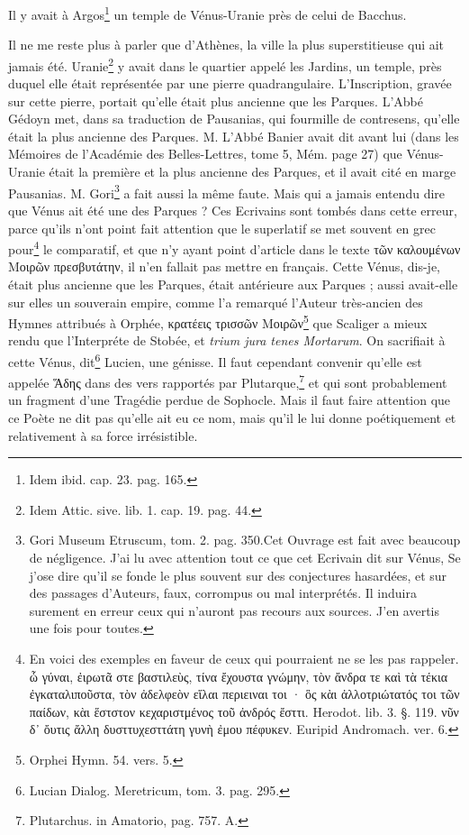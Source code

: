 \documentclass[a4paper, 11pt, oneside, polutonikogreek, french]{article}
\begin{document}
Il y avait à Argos\footnote{Idem ibid. cap. 23. pag. 165.} un temple de Vénus-Uranie près de celui de Bacchus.

Il ne me reste plus à parler que d'Athènes, la ville la plus superstitieuse qui ait jamais été. Uranie\footnote{Idem Attic. sive. lib. 1. cap. 19. pag. 44.} y avait dans le quartier appelé les Jardins, un temple, près duquel elle était représentée par une pierre quadrangulaire. L'Inscription, gravée sur cette pierre, portait qu'elle était plus ancienne que les Parques. L'Abbé Gédoyn met, dans sa traduction de Pausanias, qui fourmille de contresens, qu'elle était la plus ancienne des Parques. M. L'Abbé Banier avait dit avant lui (dans les Mémoires de l'Académie des Belles-Lettres, tome 5, Mém. page 27) que Vénus-Uranie était la première et la plus ancienne des Parques, et il avait cité en marge Pausanias. M. Gori\footnote{Gori Museum Etruscum, tom. 2. pag. 350.Cet Ouvrage est fait avec beaucoup de négligence. J'ai lu avec attention tout ce que cet Ecrivain dit sur Vénus, Se j'ose dire qu'il se fonde le plus souvent sur des conjectures hasardées, et sur des passages d'Auteurs, faux, corrompus ou mal interprétés. Il induira surement en erreur ceux qui n'auront pas recours aux sources. J'en avertis une fois pour toutes.} a fait aussi la même faute. Mais qui a jamais entendu dire que Vénus ait été une des Parques ? Ces Ecrivains sont tombés dans cette erreur, parce qu'ils n'ont point fait attention que le superlatif se met souvent en grec pour\footnote{En voici des exemples en faveur de ceux qui pourraient ne se les pas rappeler. ὧ γύναι, ἐιρωτᾶ στε βαστιλεὺς, τίνα ἔχουστα γνώμην, τὸν ἄνδρα τε καὶ τὰ τέκια ἐγκαταλιποῦστα, τὸν ἀδελφεὸν εἵλαι περιειναι τοι · ὃς κὰι ἀλλοτριώτατός τοι τῶν παίδων, κὰι ἕστστον κεχαριστμένος τοῦ ἀνδρός ἔσττι. Herodot. lib. 3. §. 119. νῦν δ᾽ ὄυτις ἄλλη δυσττυχεσττάτη γυνὴ ἐμου πέφυκεν. Euripid Andromach. ver. 6.} le comparatif, et que n'y ayant point d'article dans le texte τῶν καλουμένων Μοιρῶν πρεσβυτάτην, il n'en fallait pas mettre en français. Cette Vénus, dis-je, était plus ancienne que les Parques, était antérieure aux Parques ; aussi avait-elle sur elles un souverain empire, comme l'a remarqué l'Auteur très-ancien des Hymnes attribués à Orphée, κρατέεις τρισσῶν Μοιρῶν\footnote{Orphei Hymn. 54. vers. 5.} que Scaliger a mieux rendu que l'Interpréte de Stobée, et \emph{trium jura tenes Mortarum}. On sacrifiait à cette Vénus, dit\footnote{Lucian Dialog. Meretricum, tom. 3. pag. 295.} Lucien, une génisse. Il faut cependant convenir qu'elle est appelée Ἅδης dans des vers rapportés par Plutarque,\footnote{Plutarchus. in Amatorio, pag. 757. A.} et qui sont probablement un fragment d'une Tragédie perdue de Sophocle. Mais il faut faire attention que ce Poète ne dit pas qu'elle ait eu ce nom, mais qu'il le lui donne poétiquement et relativement à sa force irrésistible.
\end{document}
